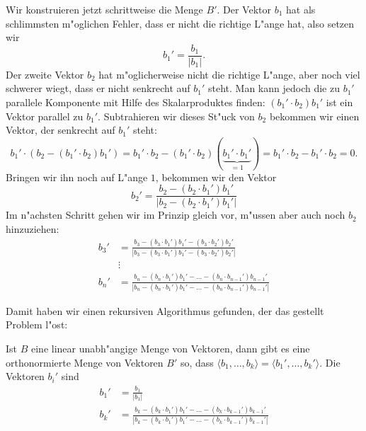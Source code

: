 Wir konstruieren jetzt schrittweise die Menge $B'$.
Der Vektor $b_1$ hat als schlimmsten m"oglichen Fehler, dass er
nicht die richtige L"ange hat, also setzen wir
\[
b_1' = \frac{b_1}{|b_1|}.
\]
Der zweite Vektor $b_2$ hat m"oglicherweise nicht die richtige L"ange,
aber noch viel schwerer wiegt, dass er nicht senkrecht auf $b_1'$
steht.
Man kann jedoch die zu $b_1'$ parallele Komponente mit Hilfe
des Skalarproduktes finden: $(b_1'\cdot b_2)b_1'$ ist ein Vektor
parallel zu $b_1'$.
Subtrahieren wir dieses St"uck von $b_2$ bekommen
wir einen Vektor, der senkrecht auf $b_1'$ steht:
\[
b_1'\cdot(b_2-(b_1'\cdot b_2)b_1')=
b_1'\cdot b_2-(b_1'\cdot b_2)(\underbrace{b_1'\cdot b_1'}_{=1})
=
b_1'\cdot b_2-
b_1'\cdot b_2=0.
\]
Bringen wir ihn noch auf L"ange $1$, bekommen wir den Vektor
\[
b_2'=\frac{
b_2-(b_2\cdot b_1')b_1'
}{
|b_2-(b_2\cdot b_1')b_1'|
}
\]
Im n"achsten Schritt gehen wir im Prinzip gleich vor, m"ussen aber
auch noch $b_2$ hinzuziehen:
\begin{align*}
b_3'&=\frac{
b_3-(b_3\cdot b_1')b_1'-(b_3\cdot b_2')b_2'
}{
|b_3-(b_3\cdot b_1')b_1'-(b_3\cdot b_2')b_2'|
}
\\
&\vdots
\\
b_n'&=\frac{
b_n-(b_n\cdot b_1')b_1'-\dots-(b_n\cdot b_{n-1}')b_{n-1}'
}{
|b_n-(b_n\cdot b_1')b_1'-\dots-(b_n\cdot b_{n-1}')b_{n-1}'|
}
\end{align*}

Damit haben wir einen rekursiven Algorithmus gefunden,
der das gestellt Problem l"ost:

\begin{satz} Ist $B$ eine linear unabh"angige Menge von Vektoren,
dann gibt es eine orthonormierte Menge von Vektoren $B'$ so, dass
$\langle b_1,\dots,b_k\rangle=\langle b_1',\dots,b_k'\rangle$.
Die
Vektoren $b_i'$ sind
\begin{align*}
b_1'&=\frac{b_1}{|b_1|}\\
b_k'&=\frac{b_k-(b_k\cdot b_1')b_1'-\dots -(b_k\cdot b_{k-1}')b_{k-1}'}%
{|b_k-(b_k\cdot b_1')b_1'-\dots -(b_k\cdot b_{k-1}')b_{k-1}'|}
\end{align*}
\end{satz}


